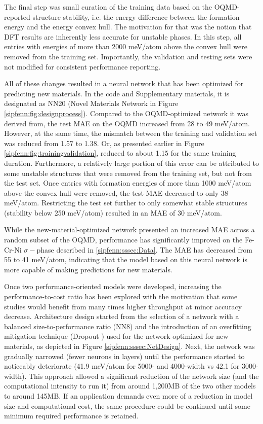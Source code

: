 The final step was small curation of the training data based on the OQMD-reported structure stability, i.e. the energy difference between the formation energy and the energy convex hull. The motivation for that was the notion that DFT results are inherently less accurate for unstable phases. In this step, all entries with energies of more than 2000 meV/atom above the convex hull were removed from the training set. Importantly, the validation and testing sets were not modified for consistent performance reporting.

All of these changes resulted in a neural network that has been optimized for predicting new materials. In the code and Supplementary materials, it is designated as NN20 (Novel Materials Network in Figure \ref{sipfenn:fig:designprocess}). Compared to the OQMD-optimized network it was derived from, the test MAE on the OQMD increased from 28 to 49 meV/atom. However, at the same time, the mismatch between the training and validation set was reduced from 1.57 to 1.38. Or, as presented earlier in Figure \ref{sipfenn:fig:trainingvalidation}, reduced to about 1.15 for the same training duration. Furthermore, a relatively large portion of this error can be attributed to some unstable structures that were removed from the training set, but not from the test set. Once entries with formation energies of more than 1000 meV/atom above the convex hull were removed, the test MAE decreased to only 38 meV/atom. Restricting the test set further to only somewhat stable structures (stability below 250 meV/atom) resulted in an MAE of 30 meV/atom.

While the new-material-optimized network presented an increased MAE across a random subset of the OQMD, performance has significantly improved on the Fe-Cr-Ni $\sigma-$phase described in \ref{sipfenn:sssec:Data}. The MAE has decreased from 55 to 41 meV/atom, indicating that the model based on this neural network is more capable of making predictions for new materials.

Once two performance-oriented models were developed, increasing the performance-to-cost ratio has been explored with the motivation that some studies would benefit from many times higher throughput at minor accuracy decrease. Architecture design started from the selection of a network with a balanced size-to-performance ratio (NN8) and the introduction of an overfitting mitigation technique (Dropout \cite{srivastava2014dropout}) used for the network optimized for new materials, as depicted in Figure \ref{sipfenn:sssec:NetDesign}. Next, the network was gradually narrowed (fewer neurons in layers) until the performance started to noticeably deteriorate (41.9 meV/atom for 5000- and 4000-width vs 42.1 for 3000-width). This approach allowed a significant reduction of the network size (and the computational intensity to run it) from around 1,200MB of the two other models to around 145MB. If an application demands even more of a reduction in model size and computational cost, the same procedure could be continued until some minimum required performance is retained. 

